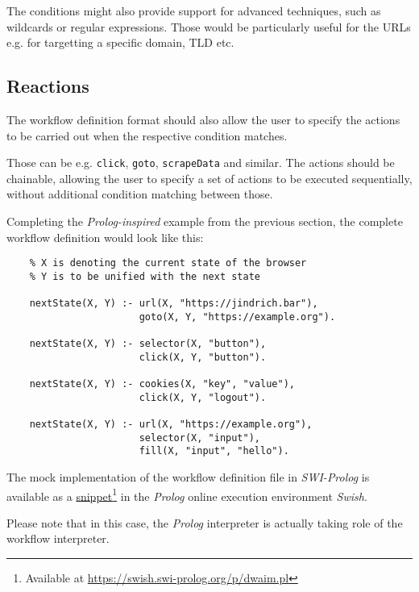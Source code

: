 The conditions might also provide support for advanced techniques, such as wildcards or regular expressions.
Those would be particularly useful for the URLs e.g. for targetting a specific domain, TLD etc.

\subsection{Reactions}

The workflow definition format should also allow the user to specify the actions to be carried out when the respective condition matches.

Those can be e.g. \texttt{click}, \texttt{goto}, \texttt{scrapeData} and similar. 
The actions should be chainable, allowing the user to specify a set of actions to be executed sequentially, without additional condition matching between those.

Completing the \textit{Prolog-inspired} example from the previous section, the complete workflow definition would look like this:

\begin{minipage}{0.95\linewidth}
\begin{verbatim}
    % X is denoting the current state of the browser
    % Y is to be unified with the next state

    nextState(X, Y) :- url(X, "https://jindrich.bar"),
                       goto(X, Y, "https://example.org").
    
    nextState(X, Y) :- selector(X, "button"),
                       click(X, Y, "button").
    
    nextState(X, Y) :- cookies(X, "key", "value"),
                       click(X, Y, "logout").
    
    nextState(X, Y) :- url(X, "https://example.org"),
                       selector(X, "input"),
                       fill(X, "input", "hello").

\end{verbatim}
\end{minipage}

The mock implementation of the workflow definition file in \textit{SWI-Prolog} is available as a \href{https://swish.swi-prolog.org/p/dwaim.pl}{snippet}\footnote{Available at \url{https://swish.swi-prolog.org/p/dwaim.pl}} in the \textit{Prolog} online execution environment \textit{Swish}. 

Please note that in this case, the \textit{Prolog} interpreter is actually taking role of the workflow interpreter.

